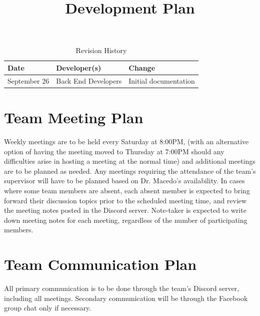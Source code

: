\documentclass[12pt]{article}
\title{Development Plan\\\progname}
\author{\authname}
\date{}
\begin{document}
\maketitle
\newpage

\tableofcontents
\listoftables

\newpage

\begin{table}[hp]
\caption{Revision History} \label{TblRevisionHistory}
\begin{tabularx}{\textwidth}{llX}
\toprule
\textbf{Date} & \textbf{Developer(s)} & \textbf{Change}\\
\midrule
September 26 & Back End Developers & Initial documentation\\
\bottomrule
\end{tabularx}
\end{table}

\pagebreak

\section{Team Meeting Plan}
Weekly meetings are to be held every Saturday at 8:00PM, (with an alternative option of having the meeting moved to Thursday at 7:00PM should any difficulties arise in hosting a meeting at the normal time) and additional meetings are to be planned as needed. Any meetings requiring the attendance of the team's supervisor will have to be planned based on Dr. Macedo's availability. In cases where some team members are absent, each absent member is expected to bring forward their discussion topics prior to the scheduled meeting time, and review the meeting notes posted in the Discord server. Note-taker is expected to write down meeting notes for each meeting, regardless of the number of participating members.\\

\pagebreak

\section{Team Communication Plan}
All primary communication is to be done through the team's Discord server, including all meetings. Secondary communication will be through the Facebook group chat only if necessary.\\
\end{document}
